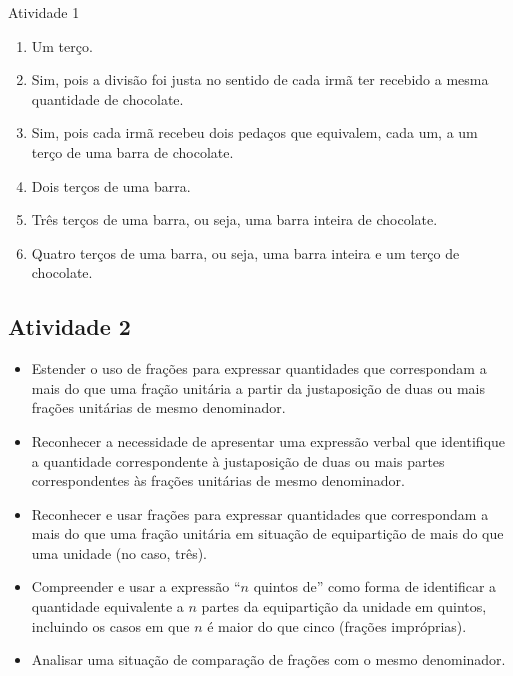 \begin{multicols}{2}
\begin{resposta*}{Atividade 1}
\begin{enumerate} [\quad a)] %
    \item       Um terço.
    \item       Sim, pois a divisão foi justa no sentido de cada irmã ter recebido a mesma quantidade de chocolate.
    \item       Sim, pois cada irmã recebeu dois pedaços que equivalem, cada um, a um terço de uma barra de chocolate.
    \item       Dois terços de uma barra.
    \item       Três terços de uma barra, ou seja, uma barra inteira de chocolate.
    \item       Quatro terços de uma barra, ou seja, uma barra inteira e um terço de chocolate.
\end{enumerate} %

\end{resposta*}


\subsection{Atividade 2}

   \vspace{.1cm}

  \begin{itemize} %
    \item       Estender o uso de frações para expressar quantidades que correspondam a mais do que uma fração unitária  a partir da justaposição de duas ou mais frações unitárias de mesmo denominador.
    \item       Reconhecer a necessidade de apresentar uma expressão verbal que identifique a quantidade correspondente à justaposição de duas ou mais partes correspondentes às frações unitárias de mesmo denominador.
    \item       Reconhecer e usar frações para expressar quantidades que correspondam a mais do que uma fração unitária em situação de equipartição de mais do que uma unidade (no caso, três).
    \item       Compreender e usar a expressão       ``$n$ quintos de''       como forma de identificar a quantidade equivalente a       $n$       partes da equipartição da unidade em quintos, incluindo os casos em que       $n$       é maior do que cinco (frações impróprias).
    \item       Analisar uma situação de comparação de frações com o mesmo denominador.
\end{itemize} %



\end{multicols}
